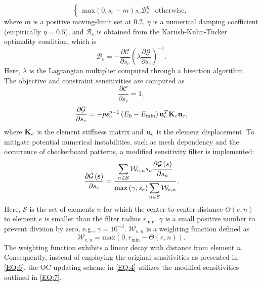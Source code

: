 \documentclass[preprint,3p]{elsarticle}
\begin{document}
\begin{linenumbers}
\begin{equation}
\begin{cases}{\mathrm{max}\left(0,s_{e}-m\right)}
s_{e}\mathcal{B}_{e}^{\eta} & {{\mathrm{otherwise}}},\end{cases}
\label{EQ:3}
\end{equation}
where ${m}$ is a positive moving-limit set at 0.2, ${\eta}$ is a numerical damping coefficient (empirically ${\eta} =0.5$), and ${\mathcal{B}_{e}}$ is obtained from the Karush-Kuhn-Tucker optimality condition, which is
\begin{equation}
\mathcal{B}_{e}=-\frac{\partial{\mathcal{C}}}{\partial{s_{e}}}\left(\lambda\frac{\partial{\mathcal{G}}}{\partial{s_{e}}}\right)^{-1}
\label{EQ:4}.
\end{equation}
Here, $\lambda$ is the Lagrangian multiplier computed through a bisection algorithm. The objective and constraint sensitivities are computed as \cite{zhou2021}
\begin{equation}
\frac{\partial{\mathcal{C}}}{\partial{s_{e}}} = 1,
\label{EQ:5}
\end{equation}
\begin{equation}
\frac{\partial{\mathcal{G}}}{\partial{s_{e}}} = -ps_e^{p-1}\left(E_0-E_\mathrm{min}\right){{\bf u}_e^{T}}{{\bf K}_e}{{\bf u}_e},
\label{EQ:6}
\end{equation}
where ${\bf K}_e$ is the element stiffness matrix and ${\bf u}_e$ is the element displacement. To mitigate potential numerical instabilities, such as mesh dependency and the occurrence of checkerboard patterns, a modified sensitivity filter \cite{andreassen2011} is implemented:
\begin{equation}
\frac{\partial\widetilde{\mathcal{G}}\left({\bf s}\right)}{\partial s_{e}}=\frac{\displaystyle\sum_{n\in\mathcal{S}}\mathcal{W}_{e,n}s_{n}\frac{\partial{\mathcal{G}\left(s\right)}}{\partial{s_{n}}}}{\mathrm{max}\displaystyle\left(\gamma,s_{e}\right)\sum_{n\in S}\mathcal{W}_{e,n}}.
\label{EQ:7}
\end{equation}
Here, ${\mathcal{S}}$ is the set of elements $n$ for which the center-to-center distance $\Theta\left({e, n}\right)$ to element $e$ is smaller than the filter radius $r_\mathrm{min}$. $\gamma$ is a small positive number to prevent division by zero, e.g., $\gamma = 10^{-3}$. $\mathcal{W}_{e,n}$ is a weighting function defined as
\begin{equation}
\mathcal{W}_{e,n} = {\mathrm{max}\left(0, r_\mathrm{min}-\Theta\left({e, n}\right)\right)}.
\label{EQ:8}
\end{equation}
The weighting function exhibits a linear decay with distance from element $n$. Consequently, instead of employing the original sensitivities as presented in \cref{EQ:6}, the OC updating scheme in \cref{EQ:4} utilizes the modified sensitivities outlined in \cref{EQ:7}. 


\end{linenumbers}
\end{document}
